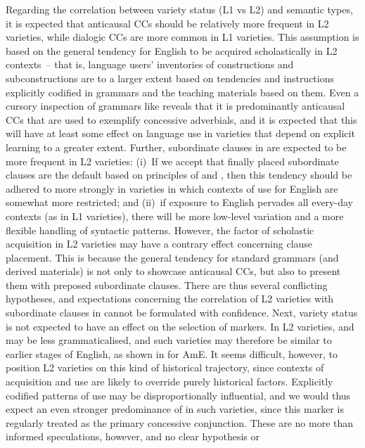 Regarding the correlation between variety status (L1 vs L2) and semantic types, it is expected that anticausal CCs should be relatively more frequent in L2 varieties, while dialogic CCs are more common in L1 varieties. This assumption is based on the general tendency for English to be acquired scholastically in L2 contexts~– that is, language users’ inventories of constructions and subconstructions are to a larger extent based on tendencies and instructions explicitly codified in grammars and the teaching materials based on them. Even a cursory inspection of grammars like \citet{QuirkEtAl1985} reveals that it is predominantly anticausal CCs that are used to exemplify concessive adverbials, and it is expected that this will have at least some effect on language use in varieties that depend on explicit learning to a greater extent. Further, subordinate clauses in  are expected to be more frequent in L2 varieties: (i)~If we accept that finally placed subordinate clauses are the default based on principles of  and , then this tendency should be adhered to more strongly in varieties in which contexts of use for English are somewhat more restricted; and (ii)~if exposure to English pervades all every-day contexts (as in L1 varieties), there will be more low-level variation and a more flexible handling of syntactic patterns. However, the factor of scholastic acquisition in L2 varieties may have a contrary effect concerning clause placement. This is because the general tendency for standard grammars (and derived materials) is not only to showcase anticausal CCs, but also to present them with preposed subordinate clauses. There are thus several conflicting hypotheses, and expectations concerning the correlation of L2 varieties with subordinate clauses in  cannot be formulated with confidence. Next, variety status is not expected to have an effect on the selection of markers. In L2 varieties,  and  may be less grammaticalised, and such varieties may therefore be similar to earlier stages of English, as shown in  for AmE. It seems difficult, however, to position L2 varieties on this kind of historical trajectory, since contexts of acquisition and use are likely to override purely historical factors. Explicitly codified patterns of use may be disproportionally influential, and we would thus expect an even stronger predominance of  in such varieties, since this marker is regularly treated as the primary concessive conjunction. These are no more than informed speculations, however, and no clear hypothesis or 